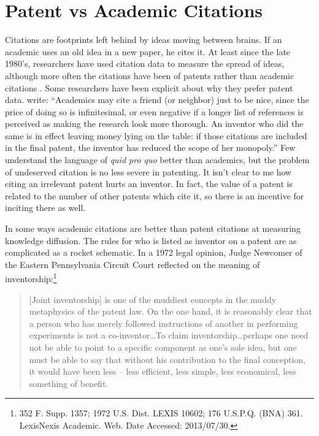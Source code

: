 \documentclass[]{article}
\begin{document}
\section{Patent vs Academic Citations}

Citations are footprints left behind by ideas moving between brains. If
an academic uses an old idea in a new paper, he cites it. At least since
the late 1980's, researchers have used citation data to measure the
spread of ideas, although more often the citations have been of patents
rather than academic citations \citep{griliches1998patent}. Some
researchers have been explicit about why they prefer patent data.
\citep{jaffe2002patents} write: ``Academics may cite a friend (or
neighbor) just to be nice, since the price of doing so is infinitesimal,
or even negative if a longer list of references is perceived as making
the research look more thorough. An inventor who did the same is in
effect leaving money lying on the table: if those citations are included
in the final patent, the inventor has reduced the scope of her
monopoly.'' Few understand the language of \emph{quid pro quo} better
than academics, but the problem of undeserved citation is no less severe
in patenting. It isn't clear to me how citing an irrelevant patent hurts
an inventor. In fact, the value of a patent is related to the number of
other patents which cite it, so there is an incentive for inciting there
as well.

In some ways academic citations are better than patent citations at
measuring knowledge diffusion. The rules for who is listed as inventor
on a patent are as complicated as a rocket schematic. In a 1972 legal
opinion, Judge Newcomer of the Eastern Pennsylvania Circuit Court
reflected on the meaning of
inventorship:\footnote{352 F. Supp. 1357; 1972 U.S. Dist. LEXIS 10602; 176 U.S.P.Q. (BNA) 361. LexisNexis Academic. Web. Date Accessed: 2013/07/30.}

\begin{quote}
{[}Joint inventorship{]} is one of the muddiest concepts in the muddy
metaphysics of the patent law. On the one hand, it is reasonably clear
that a person who has merely followed instructions of another in
performing experiments is not a co-inventor\ldots{}To claim
inventorship\ldots perhaps one need not be able to point to a specific
component as one's sole idea, but one must be able to say that without
his contribution to the final conception, it would have been less --
less efficient, less simple, less economical, less something of benefit.
\end{quote}
\end{document}
